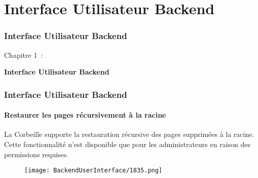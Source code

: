 %

\section{Interface Utilisateur Backend}
\begin{frame}[fragile]
	\frametitle{Interface Utilisateur Backend}

	\begin{center}\huge{Chapitre 1~:}\end{center}
	\begin{center}\huge{\color{typo3darkgrey}\textbf{Interface Utilisateur Backend}}\end{center}

\end{frame}

\begin{frame}[fragile]
	\frametitle{Interface Utilisateur Backend}
	\framesubtitle{Restaurer les pages récursivement à la racine}

	La Corbeille supporte la restauration récursive des pages supprimées à la racine.
	Cette fonctionnalité n'est disponible que pour les administrateurs en raison des permissions requises.

	\begin{figure}
		\texttt{[image: BackendUserInterface/1835.png]}
	\end{figure}

\end{frame}

